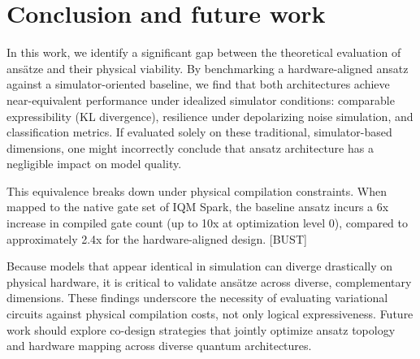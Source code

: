 \documentclass[11pt]{article}
\begin{document}
\section{Conclusion and future work}
In this work, we identify a significant gap between the theoretical evaluation of ansätze and their physical viability. By benchmarking a hardware-aligned ansatz against a simulator-oriented baseline, we find that both architectures achieve near-equivalent performance under idealized simulator conditions: comparable expressibility (KL divergence), resilience under depolarizing noise simulation, and classification metrics. If evaluated solely on these traditional, simulator-based dimensions, one might incorrectly conclude that ansatz architecture has a negligible impact on model quality. 

This equivalence breaks down under physical compilation constraints. When mapped to the native gate set of IQM Spark, the baseline ansatz incurs a 6x increase in compiled gate count (up to 10x at optimization level 0), compared to approximately 2.4x for the hardware-aligned design. [BUST]

Because models that appear identical in simulation can diverge drastically on physical hardware, it is critical to validate ansätze across diverse, complementary dimensions. These findings underscore the necessity of evaluating variational circuits against physical compilation costs, not only logical expressiveness. Future work should explore co-design strategies that jointly optimize ansatz topology and hardware mapping across diverse quantum architectures.
\end{document}
